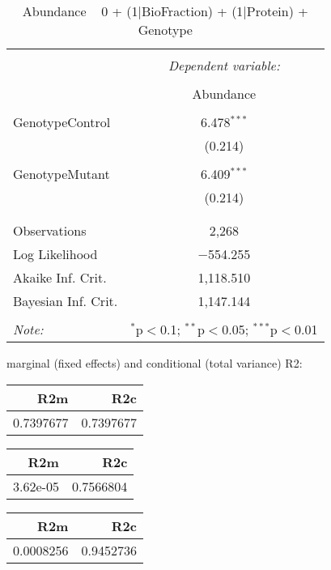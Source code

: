 \documentclass[11pt]{report}
\begin{document}
\begin{table}[!htbp] \centering 
  \caption{Abundance ~ 0 + (1|BioFraction) + (1|Protein) + Genotype} 
  \label{} 
\begin{tabular}{@{\extracolsep{5pt}}lc} 
\\[-1.8ex]\hline 
\hline \\[-1.8ex] 
 & \multicolumn{1}{c}{\textit{Dependent variable:}} \\ 
\cline{2-2} 
\\[-1.8ex] & Abundance \\ 
\hline \\[-1.8ex] 
 GenotypeControl & 6.478$^{***}$ \\ 
  & (0.214) \\ 
  & \\ 
 GenotypeMutant & 6.409$^{***}$ \\ 
  & (0.214) \\ 
  & \\ 
\hline \\[-1.8ex] 
Observations & 2,268 \\ 
Log Likelihood & $-$554.255 \\ 
Akaike Inf. Crit. & 1,118.510 \\ 
Bayesian Inf. Crit. & 1,147.144 \\ 
\hline 
\hline \\[-1.8ex] 
\textit{Note:}  & \multicolumn{1}{r}{$^{*}$p$<$0.1; $^{**}$p$<$0.05; $^{***}$p$<$0.01} \\ 
\end{tabular} 
\end{table} 
marginal (fixed effects) and conditional (total variance) R2:

\begin{tabular}{r|r}
\hline
R2m & R2c\\
\hline
0.7397677 & 0.7397677\\
\hline
\end{tabular}

\begin{tabular}{r|r}
\hline
R2m & R2c\\
\hline
3.62e-05 & 0.7566804\\
\hline
\end{tabular}

\begin{tabular}{r|r}
\hline
R2m & R2c\\
\hline
0.0008256 & 0.9452736\\
\hline
\end{tabular}
\end{document}
